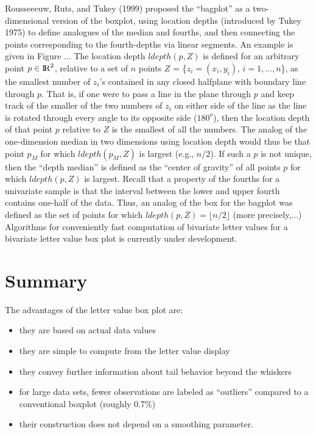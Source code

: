 \documentclass[11pt]{article}
\newcommand{\Reals}{{\rm I\kern-.1667em{}R}}
\begin{document}
Rousseeeuw, Ruts, and Tukey (1999) proposed the ``bagplot''
as a two-dimensional version of the boxplot, using location 
depths (introduced by Tukey 1975)
to define analogues of the median and fourths, and then
connecting the points corresponding to the fourth-depths 
via linear segments.  An example is given in Figure ...
The location depth $ldepth(p,Z)$ is defined for an arbitrary 
point $p \in \Reals^2$, relative to a set of $n$ points
$Z$ = \{$z_i = (x_i, y_i)$, $i = 1,...,n$\}, as 
the smallest number of $z_i$'s contained in
any closed halfplane with boundary line through $p$.
That is, if one were to pass a line in the plane through $p$
and keep track of the smaller of the two numbers of $z_i$ on 
either side of the line as the line is rotated through every
angle to its opposite side ($180^o$), then the location depth
of that point $p$ relative to $Z$ is the smallest of all the
numbers.  The analog of the one-dimension median in two
dimensions using location depth would thus be that point
$p_M$ for which $ldepth(p_M, Z)$ is largest (e.g., $n/2$).
If such a $p$ is not unique, then the ``depth median'' is
defined as the ``center of gravity'' of all points $p$ for
which $ldepth(p,Z)$ is largest.  Recall that a property
of the fourths for a univariate sample is that the 
interval between the lower and upper fourth contains
one-half of the data.  Thus, an analog of the box for
the bagplot was defined as the set of points for which
$ldepth(p,Z) = \lfloor n/2 \rfloor$ (more precisely,...)
Algorithms for conveniently fast computation of bivariate letter values 
for a bivariate letter value box plot 
is currently under development.
 



\vspace{-14mm}
\section{Summary}

The advantages of the letter value box plot are:
\begin{itemize}
\item 
they are based on actual data values 
\item
they are simple to compute from the letter value display
\item 
they convey further information about tail behavior beyond the whiskers
\item
for large data sets, fewer observations are labeled as ``outliers''
compared to a conventional boxplot (roughly 0.7\%)
\item their construction does not depend on a smoothing parameter.
\end{itemize} 
\end{document}
